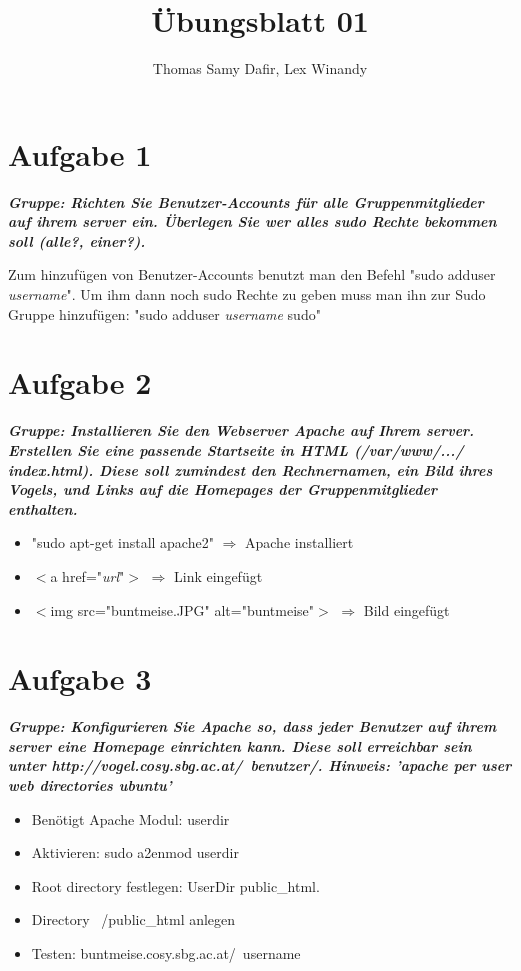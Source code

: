 \documentclass[12pt, a4paper]{report}
\title{Übungsblatt 01}
\author{Thomas Samy Dafir, Lex Winandy}
\date{}
\begin{document}
\maketitle

\section*{Aufgabe 1}
\textbf{\textit{Gruppe: Richten Sie Benutzer-Accounts für alle Gruppenmitglieder auf ihrem server ein. Überlegen Sie wer alles sudo Rechte bekommen soll (alle?, einer?).}}

Zum hinzufügen von Benutzer-Accounts benutzt man den Befehl "sudo adduser \textit{username}". Um ihm dann noch sudo Rechte zu geben muss man ihn zur Sudo Gruppe hinzufügen: "sudo adduser \textit{username} sudo"
\section*{Aufgabe 2}
\textbf{\textit{Gruppe: Installieren Sie den Webserver Apache auf Ihrem server. Erstellen Sie eine passende Startseite in HTML (/var/www/.../ index.html). Diese soll zumindest den Rechnernamen, ein Bild ihres Vogels, und Links auf die Homepages der Gruppenmitglieder enthalten.}}
\begin{itemize}
	\item "sudo apt-get install apache2" $\Rightarrow$ Apache installiert
	\item $<$a href="\textit{url}"$>$ $\Rightarrow$ Link eingefügt
	\item $<$img src="buntmeise.JPG" alt="buntmeise"$>$ $\Rightarrow$ Bild eingefügt
\end{itemize}

\section*{Aufgabe 3}
\textbf{\textit{Gruppe: Konfigurieren Sie Apache so, dass jeder Benutzer auf ihrem server eine Homepage einrichten kann. Diese soll erreichbar sein unter http://vogel.cosy.sbg.ac.at/~benutzer/.
Hinweis: ’apache per user web directories ubuntu’}}

\begin{itemize}
	\item Benötigt Apache Modul: userdir
	\item Aktivieren: sudo a2enmod userdir
	\item Root directory festlegen: UserDir public\_html.
	\item Directory ~/public\_html anlegen
	\item Testen: buntmeise.cosy.sbg.ac.at/~username
\end{itemize}
\end{document}
